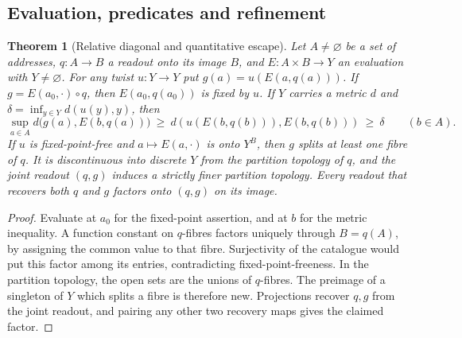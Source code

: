 \documentclass[11pt,reqno]{amsart}
\newtheorem{theorem}{Theorem}[section]
\theoremstyle{definition}
\theoremstyle{remark}
\numberwithin{equation}{section}
\begin{document}
\subsection*{Evaluation, predicates and refinement}

\begin{theorem}[Relative diagonal and quantitative escape]\label{d4:diagonal}
Let \(A\ne\varnothing\) be a set of addresses, \(q:A\to B\) a readout
onto its image \(B\), and \(E:A\times B\to Y\) an evaluation with
\(Y\ne\varnothing\). For any twist \(u:Y\to Y\) put
\(g(a)=u(E(a,q(a)))\). If \(g=E(a_0,\cdot)\circ q\), then
\(E(a_0,q(a_0))\) is fixed by \(u\). If \(Y\) carries a metric \(d\) and
\(\delta=\inf_{y\in Y}d(u(y),y)\), then
\[
  \sup_{a\in A}d\bigl(g(a),E(b,q(a))\bigr)
      \ \ge\ d(u(E(b,q(b))),E(b,q(b)))\ \ge\ \delta
      \qquad(b\in A).
\]
If \(u\) is fixed-point-free and \(a\mapsto E(a,\cdot)\) is onto \(Y^B\),
then \(g\) splits at least one fibre of \(q\). It is discontinuous into
discrete \(Y\) from the partition topology of \(q\), and the joint
readout \((q,g)\) induces a strictly finer partition topology. Every
readout that recovers both \(q\) and \(g\) factors onto \((q,g)\) on its
image.
\end{theorem}

\begin{proof}
Evaluate at \(a_0\) for the fixed-point assertion, and at \(b\) for the
metric inequality. A function constant on \(q\)-fibres factors uniquely
through \(B=q(A)\), by assigning the common value to that fibre.
Surjectivity of the catalogue would put this factor among its entries,
contradicting fixed-point-freeness. In the partition topology, the open
sets are the unions of \(q\)-fibres. The preimage of a singleton of \(Y\)
which splits a fibre is therefore new. Projections recover \(q,g\) from
the joint readout, and pairing any other two recovery maps gives the
claimed factor.
\end{proof}
\end{document}
